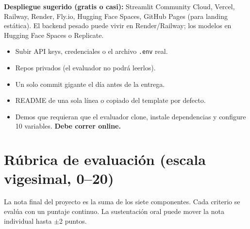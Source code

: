 \documentclass[11pt,a4paper]{article}
\begin{document}
\textbf{Despliegue sugerido (gratis o casi):} Streamlit Community Cloud, Vercel,
Railway, Render, Fly.io, Hugging Face Spaces, GitHub Pages (para landing est\'atica).
El backend pesado puede vivir en Render/Railway; los modelos en Hugging Face Spaces
o Replicate.

\begin{tcolorbox}[warnbox={No hacer}]
\begin{itemize}[leftmargin=1.2em,itemsep=1pt,topsep=1pt]
  \item Subir API keys, credenciales o el archivo \texttt{.env} real.
  \item Repos privados (el evaluador no podr\'a leerlos).
  \item Un solo commit gigante el d\'ia antes de la entrega.
  \item README de una sola l\'inea o copiado del template por defecto.
  \item Demos que requieran que el evaluador clone, instale dependencias
        y configure 10 variables. \textbf{Debe correr online.}
\end{itemize}
\end{tcolorbox}

\section{R\'ubrica de evaluaci\'on (escala vigesimal, 0--20)}

La nota final del proyecto es la suma de los siete componentes. Cada criterio
se eval\'ua con un puntaje continuo. La sustentaci\'on oral puede mover la
nota individual hasta $\pm$2 puntos.
\end{document}
